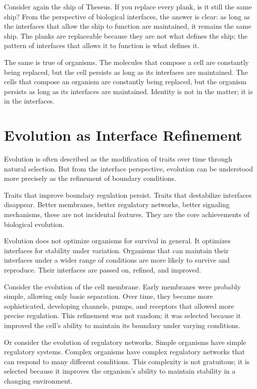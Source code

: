 \documentclass[
  openright]{book}
\begin{document}
Consider again the ship of Theseus. If you replace every plank, is it
still the same ship? From the perspective of biological interfaces, the
answer is clear: as long as the interfaces that allow the ship to
function are maintained, it remains the same ship. The planks are
replaceable because they are not what defines the ship; the pattern of
interfaces that allows it to function is what defines it.

The same is true of organisms. The molecules that compose a cell are
constantly being replaced, but the cell persists as long as its
interfaces are maintained. The cells that compose an organism are
constantly being replaced, but the organism persists as long as its
interfaces are maintained. Identity is not in the matter; it is in the
interfaces.

\section{Evolution as Interface
Refinement}\label{evolution-as-interface-refinement}

Evolution is often described as the modification of traits over time
through natural selection. But from the interface perspective, evolution
can be understood more precisely as the refinement of boundary
conditions.

Traits that improve boundary regulation persist. Traits that destabilize
interfaces disappear. Better membranes, better regulatory networks,
better signaling mechanisms, these are not incidental features. They are
the core achievements of biological evolution.

Evolution does not optimize organisms for survival in general. It
optimizes interfaces for stability under variation. Organisms that can
maintain their interfaces under a wider range of conditions are more
likely to survive and reproduce. Their interfaces are passed on,
refined, and improved.

Consider the evolution of the cell membrane. Early membranes were
probably simple, allowing only basic separation. Over time, they became
more sophisticated, developing channels, pumps, and receptors that
allowed more precise regulation. This refinement was not random; it was
selected because it improved the cell's ability to maintain its boundary
under varying conditions.

Or consider the evolution of regulatory networks. Simple organisms have
simple regulatory systems. Complex organisms have complex regulatory
networks that can respond to many different conditions. This complexity
is not gratuitous; it is selected because it improves the organism's
ability to maintain stability in a changing environment.
\end{document}

